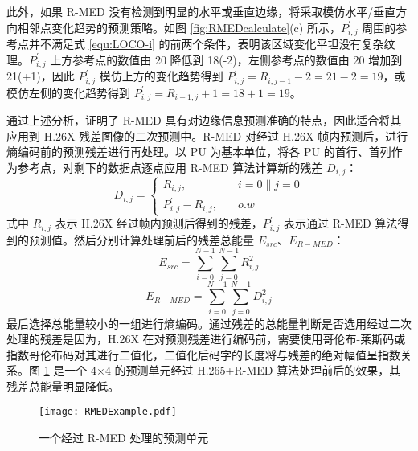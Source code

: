 此外，如果 R-MED 没有检测到明显的水平或垂直边缘，将采取模仿水平/垂直方向相邻点变化趋势的预测策略。如图 \ref{fig:RMEDcalculate}(c) 所示，$P_{i,j}^{'}$ 周围的参考点并不满足式 \ref{equ:LOCO-i} 的前两个条件，表明该区域变化平坦没有复杂纹理。$P_{i,j}^{'}$ 上方参考点的数值由 20 降低到 18(-2)，左侧参考点的数值由 20 增加到 21(+1)，因此 $P_{i,j}^{'}$ 模仿上方的变化趋势得到 $P_{i,j}^{'}=R_{i,j-1}-2=21-2=19$，或模仿左侧的变化趋势得到 $P_{i,j}^{'}=R_{i-1,j}+1=18+1=19$。

通过上述分析，证明了 R-MED 具有对边缘信息预测准确的特点，因此适合将其应用到 H.26X 残差图像的二次预测中。R-MED 对经过 H.26X 帧内预测后，进行熵编码前的预测残差进行再处理。以 PU 为基本单位，将各 PU 的首行、首列作为参考点，对剩下的数据点逐点应用 R-MED 算法计算新的残差 $D_{i,j}$：
\begin{equation}
    D_{i,j}=\left\{
    \begin{aligned}
        R_{i,j}, \quad             & i=0 \parallel j=0 \\
        P_{i,j}^{'}-R_{i,j}, \quad & o.w
    \end{aligned}
    \right.
\end{equation}
式中 $R_{i,j}$ 表示 H.26X 经过帧内预测后得到的残差，$P_{i,j}^{'}$ 表示通过 R-MED 算法得到的预测值。然后分别计算处理前后的残差总能量 $E_{src}$、$E_{R-MED}$：
\begin{equation}
    E_{src}=\sum_{i=0}^{N-1} \sum_{j=0}^{N-1} R_{i,j}^{2}
\end{equation}
\begin{equation}
    E_{R-MED}=\sum_{i=0}^{N-1} \sum_{j=0}^{N-1} D_{i,j}^{2}
\end{equation}
最后选择总能量较小的一组进行熵编码。通过残差的总能量判断是否选用经过二次处理的残差是因为，H.26X 在对预测残差进行编码前，需要使用哥伦布-莱斯码或指数哥伦布码对其进行二值化，二值化后码字的长度将与残差的绝对幅值呈指数关系。图 \ref{fig:RMEDExample} 是一个 4$\times$4 的预测单元经过 H.265+R-MED 算法处理前后的效果，其残差总能量明显降低。
\begin{figure}[hbt]
    \centering
    \texttt{[image: RMEDExample.pdf]}
    \caption{一个经过 R-MED 处理的预测单元}
    \label{fig:RMEDExample}
\end{figure}

